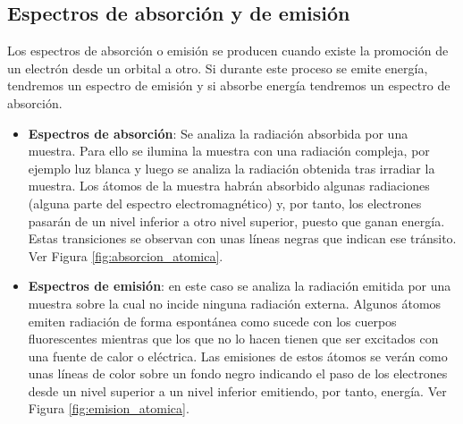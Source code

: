 \subsection{Espectros de absorción y de emisión}\label{subsec:espectros-de-absorcion-y-de-emision}

Los espectros de absorción o emisión se producen cuando existe la promoción de un electrón desde un orbital a otro.
Si durante este proceso se emite energía, tendremos un espectro de emisión y si absorbe energía tendremos un espectro de absorción.
\begin{itemize}
    \item \textbf{Espectros de absorción}: Se analiza la radiación absorbida por una muestra.
    Para ello se ilumina la muestra con una radiación compleja, por ejemplo luz blanca y luego se analiza la radiación obtenida tras irradiar la muestra.
    Los átomos de la muestra habrán absorbido algunas radiaciones (alguna parte del espectro electromagnético) y, por tanto, los electrones pasarán de un nivel inferior a otro nivel superior, puesto que ganan energía.
    Estas transiciones se observan con unas líneas negras que indican ese tránsito. Ver Figura \ref{fig:absorcion_atomica}.


    \item \textbf{Espectros de emisión}: en este caso se analiza la radiación emitida por una muestra sobre la cual no incide ninguna radiación externa. Algunos átomos emiten radiación de forma espontánea como sucede con los cuerpos fluorescentes mientras que los que no lo hacen tienen que ser excitados con una fuente de calor o eléctrica. Las emisiones de estos átomos se verán como unas líneas de color sobre un fondo negro indicando el paso de los electrones desde un nivel superior a un nivel inferior emitiendo, por tanto, energía. Ver Figura \ref{fig:emision_atomica}.
\end{itemize}

